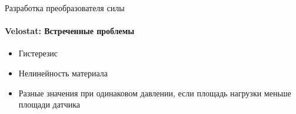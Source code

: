 \documentclass[aspectratio=169,xcolor=table]{beamer}
\begin{document}
\begin{frame}[t]{Разработка преобразователя силы}
    \framesubtitle{Velostat: Встреченные проблемы}
    \vspace{-20pt}
    \begin{multicols}{2}
        {\large
            \begin{itemize}
                \item Гистерезис
                \item Нелинейность материала
                \item Разные значения при одинаковом давлении, если площадь нагрузки меньше площади датчика
            \end{itemize}}
            \begin{figure}[H]
                \centering
\end{figure}
\end{multicols}
\end{frame}
\end{document}
